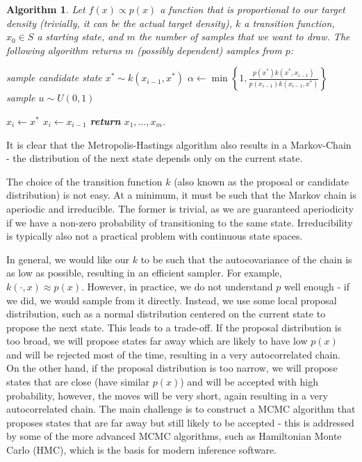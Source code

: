 \documentclass{book}
\theoremstyle{plain}%
\newtheorem{algo}{Algorithm}[section]
\theoremstyle{definition}
\newlength{\arrow}
\begin{document}
\begin{algo}
Let $f(x) \propto p(x)$ a function that is proportional to our target density (trivially, it can be the actual target density), $k$ a transition function, $x_0 \in S$ a starting state, and $m$ the number of samples that we want to draw. The following algorithm returns $m$ (possibly dependent) samples from $p$:
\begin{algorithmic}[1]
     
\State sample candidate state $x^* \sim k(x_{i-1}, x^*)$
\State $\alpha \gets \min \left\lbrace 1, \frac{p(x^*)k(x^*,x_{i-1})}{p(x_{i-1})k(x_{i-1},x^*)}\right\rbrace$
\State sample $u \sim U(0,1)$

\State $x_i \gets x^*$  
\Else 
\State $x_i \gets x_{i-1}$     
\EndIf
              \EndFor
              \State \textbf{return} $x_1,...,x_m$.
        \EndProcedure
    \end{algorithmic}\label{alg:bootstrap}
\end{algo}

It is clear that the Metropolis-Hastings algorithm also results in a Markov-Chain - the distribution of the next state depends only on the current state.

The choice of the transition function $k$ (also known as the proposal or candidate distribution) is not easy. At a minimum, it must be such that the Markov chain is aperiodic and irreducible. The former is trivial, as we are guaranteed aperiodicity if we have a non-zero probability of transitioning to the same state. Irreducibility is typically also not a practical problem with continuous state spaces.

In general, we would like our $k$ to be such that the autocovariance of the chain is as low as possible, resulting in an efficient sampler. For example, $k(\cdot, x) \approx p(x)$. However, in practice, we do not understand $p$ well enough - if we did, we would sample from it directly. Instead, we use some local proposal distribution, such as a normal distribution centered on the current state to propose the next state. This leads to a trade-off. If the proposal distribution is too broad, we will propose states far away which are likely to have low $p(x)$ and will be rejected most of the time, resulting in a very autocorrelated chain. On the other hand, if the proposal distribution is too narrow, we will propose states that are close (have similar $p(x)$) and will be accepted with high probability, however, the moves will be very short, again resulting in a very autocorrelated chain. The main challenge is to construct a MCMC algorithm that proposes states that are far away but still likely to be accepted - this is addressed by some of the more advanced MCMC algorithms, such as Hamiltonian Monte Carlo (HMC), which is the basis for modern inference software.
\end{document}
